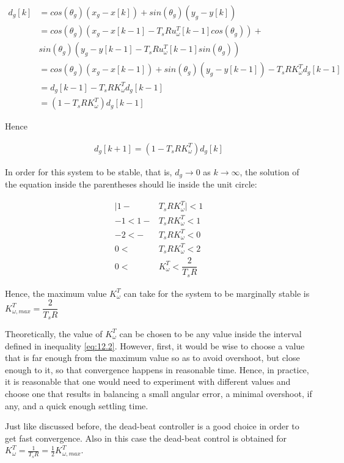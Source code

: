 \begin{align*}
  d_g[k] &= cos(\theta_g) (x_g - x[k]) + sin(\theta_g) (y_g - y[k]) \\
         &= cos(\theta_g) (x_g - x[k-1] - T_s R u_{\omega}^T[k-1] cos(\theta_g)) + \\
         &  sin(\theta_g) (y_g - y[k-1] - T_s R u_{\omega}^T[k-1] sin(\theta_g)) \\
         &= cos(\theta_g) (x_g - x[k-1]) + sin(\theta_g) (y_g - y[k-1]) -T_s R K_{\omega}^T d_g[k-1]  \\
         &= d_g[k-1] - T_s R K_{\omega}^T d_g[k-1]  \\
         &= (1-T_s R K_{\omega}^T)d_g[k-1]
\end{align*}

Hence

\begin{align*}
  d_g[k+1]= (1-T_s R K_{\omega}^T)d_g[k]
\end{align*}

In order for this system to be stable, that is, $d_g \to 0$ as $k \to \infty$,
the solution of the equation inside the parentheses should lie inside the unit
circle:

\begin{align}
  \Big|1 - &T_s R K_{\omega}^T\Big| < 1 \nonumber \\
  -1 < 1 - &T_s R K_{\omega}^T < 1 \nonumber \\
  -2 < - &T_s R K_{\omega}^T < 0 \nonumber \\
   0 <\ &T_s R K_{\omega}^T < 2 \nonumber \\
   0 <\ &K_{\omega}^T < \dfrac{2}{T_s R} \label{eq:12.2}
\end{align}

Hence, the maximum value $K_{\omega}^T$ can take for the system to be marginally
stable is $K_{\omega,max}^T = \dfrac{2}{T_s R}$

Theoretically, the value of $K_{\omega}^T$ can be chosen to be any value inside
the interval defined in inequality \ref{eq:12.2}. However, first, it would be
wise to choose a value that is far enough from the maximum value so as to avoid
overshoot, but close enough to it, so that convergence happens in reasonable
time. Hence, in practice, it is reasonable that one would need to experiment
with different values and choose one that results in balancing a small angular
error, a minimal overshoot, if any, and a quick enough settling time.

Just like discussed before, the dead-beat controller is a good choice in order
to get fast convergence. Also in this case the dead-beat control is obtained for
$K_\omega ^T = \frac{1}{T_s R} = \frac{1}{2}K_{\omega,max} ^T$.
